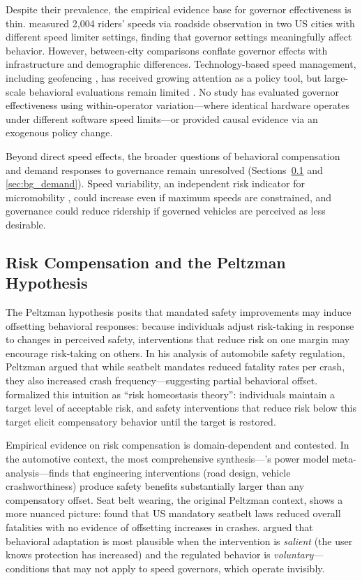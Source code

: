 Despite their prevalence, the empirical evidence base for governor effectiveness is thin. \citet{cicchino2023speed} measured 2,004 riders' speeds via roadside observation in two US cities with different speed limiter settings, finding that governor settings meaningfully affect behavior. However, between-city comparisons conflate governor effects with infrastructure and demographic differences. Technology-based speed management, including geofencing \citep{lime2023geofencing, caggiani2023geofencing}, has received growing attention as a policy tool, but large-scale behavioral evaluations remain limited \citep{neshagaran2024safety}. No study has evaluated governor effectiveness using within-operator variation---where identical hardware operates under different software speed limits---or provided causal evidence via an exogenous policy change.

Beyond direct speed effects, the broader questions of behavioral compensation and demand responses to governance remain unresolved (Sections~\ref{sec:bg_compensation} and \ref{sec:bg_demand}). Speed variability, an independent risk indicator for micromobility \citep{twisk2021speed}, could increase even if maximum speeds are constrained, and governance could reduce ridership if governed vehicles are perceived as less desirable.

\subsection{Risk Compensation and the Peltzman Hypothesis}
\label{sec:bg_compensation}

The Peltzman hypothesis \citep{peltzman1975effects} posits that mandated safety improvements may induce offsetting behavioral responses: because individuals adjust risk-taking in response to changes in perceived safety, interventions that reduce risk on one margin may encourage risk-taking on others. In his analysis of automobile safety regulation, Peltzman argued that while seatbelt mandates reduced fatality rates per crash, they also increased crash frequency---suggesting partial behavioral offset. \citet{wilde1982theory} formalized this intuition as ``risk homeostasis theory'': individuals maintain a target level of acceptable risk, and safety interventions that reduce risk below this target elicit compensatory behavior until the target is restored.

Empirical evidence on risk compensation is domain-dependent and contested. In the automotive context, the most comprehensive synthesis---\citeauthor{elvik2013reexamination}'s power model meta-analysis---finds that engineering interventions (road design, vehicle crashworthiness) produce safety benefits substantially larger than any compensatory offset. Seat belt wearing, the original Peltzman context, shows a more nuanced picture: \citet{cohen2003effects} found that US mandatory seatbelt laws reduced overall fatalities with no evidence of offsetting increases in crashes. \citet{hedlund2000risky} argued that behavioral adaptation is most plausible when the intervention is \textit{salient} (the user knows protection has increased) and the regulated behavior is \textit{voluntary}---conditions that may not apply to speed governors, which operate invisibly.

